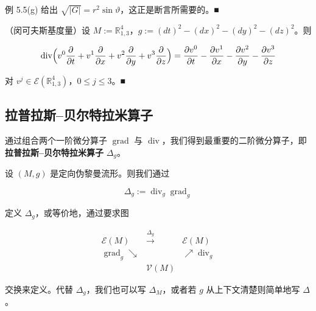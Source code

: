 \begin{example}
\begin{items}
\proofhead
例 5.5(g) 给出 $ \sqrt{|G|} = r^{2}\sin\vartheta $，这正是断言所需要的。\nobreak\hspace{0.35em}■
\item

（闵可夫斯基度量）设 $ M := \mathbb{R}^4_{1,3} $，$ g := (dt)^2 - (dx)^2 - (dy)^2 - (dz)^2 $。则

\[
\operatorname{div}\Bigl(v^{0}\frac{\partial}{\partial t} + v^{1}\frac{\partial}{\partial x} + v^{2}\frac{\partial}{\partial y} + v^{3}\frac{\partial}{\partial z}\Bigr) = \frac{\partial v^{0}}{\partial t} - \frac{\partial v^{1}}{\partial x} - \frac{\partial v^{2}}{\partial y} - \frac{\partial v^{3}}{\partial z}
\]

对 $ v^{j} \in \mathcal{E}(\mathbb{R}^4_{1,3}) $，$ 0 \le j \le 3 $。\nobreak\hspace{0.35em}■

\end{items}

\end{example}

\subsection*{拉普拉斯–贝尔特拉米算子}

通过组合两个一阶微分算子 $ \operatorname{grad} $ 与 $ \operatorname{div} $，我们得到最重要的二阶微分算子，即\textbf{拉普拉斯–贝尔特拉米算子} $ \Delta_g $。

设 $ (M,g) $ 是定向伪黎曼流形。则我们通过

\[
\Delta_{g} := \operatorname{div}_{g}\operatorname{grad}_{g}
\]

定义 $ \Delta_g $，或等价地，通过要求图

\begin{equation*}
\begin{array}{ccc} \mathcal{E}(M) & \xrightarrow{\Delta_{g}} & \mathcal{E}(M) \\ \operatorname{grad}_{g}\searrow & & \nearrow\operatorname{div}_{g} \\ & \mathcal{V}(M) & \end{array}
\end{equation*}

交换来定义。代替 $ \Delta_g $，我们也可以写 $ \Delta_M $，或者若 $ g $ 从上下文清楚则简单地写 $ \Delta $。

